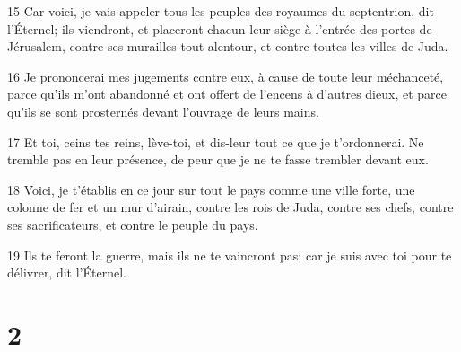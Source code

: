 \par 15 Car voici, je vais appeler tous les peuples des royaumes du septentrion, dit l'Éternel; ils viendront, et placeront chacun leur siège à l'entrée des portes de Jérusalem, contre ses murailles tout alentour, et contre toutes les villes de Juda.
\par 16 Je prononcerai mes jugements contre eux, à cause de toute leur méchanceté, parce qu'ils m'ont abandonné et ont offert de l'encens à d'autres dieux, et parce qu'ils se sont prosternés devant l'ouvrage de leurs mains.
\par 17 Et toi, ceins tes reins, lève-toi, et dis-leur tout ce que je t'ordonnerai. Ne tremble pas en leur présence, de peur que je ne te fasse trembler devant eux.
\par 18 Voici, je t'établis en ce jour sur tout le pays comme une ville forte, une colonne de fer et un mur d'airain, contre les rois de Juda, contre ses chefs, contre ses sacrificateurs, et contre le peuple du pays.
\par 19 Ils te feront la guerre, mais ils ne te vaincront pas; car je suis avec toi pour te délivrer, dit l'Éternel.

\chapter{2}


